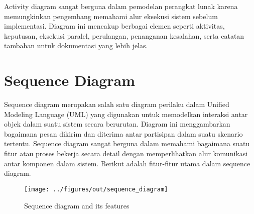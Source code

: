 Activity diagram sangat berguna dalam pemodelan perangkat lunak karena memungkinkan pengembang memahami alur eksekusi sistem sebelum implementasi. Diagram ini mencakup berbagai elemen seperti aktivitas, keputusan, eksekusi paralel, perulangan, penanganan kesalahan, serta catatan tambahan untuk dokumentasi yang lebih jelas.


\section{Sequence Diagram}

Sequence diagram merupakan salah satu diagram perilaku dalam Unified Modeling Language (UML) yang digunakan untuk memodelkan interaksi antar objek dalam suatu sistem secara berurutan. Diagram ini menggambarkan bagaimana pesan dikirim dan diterima antar partisipan dalam suatu skenario tertentu. Sequence diagram sangat berguna dalam memahami bagaimana suatu fitur atau proses bekerja secara detail dengan memperlihatkan alur komunikasi antar komponen dalam sistem. Berikut adalah fitur-fitur utama dalam sequence diagram.

\begin{figure}
	\centering
	\texttt{[image: ../figures/out/sequence\_diagram]}
	\caption{Sequence diagram and its features}
	\label{fig:sequence_diagram}
\end{figure}

